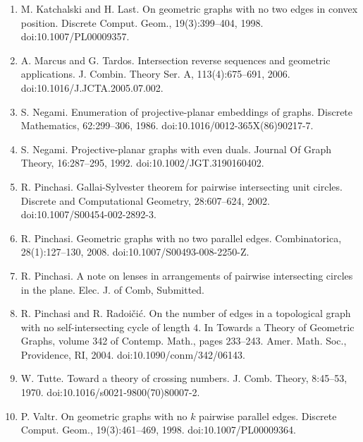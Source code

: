 \begin{enumerate}
\item[]  [12]  M. Katchalski and H. Last.  On geometric graphs with no two edges in convex position.  Discrete Comput. Geom., 19(3):399–404, 1998.  doi:10.1007/PL00009357.  
\item[]  [13]  A. Marcus and G. Tardos.  Intersection reverse sequences and geometric applications.  J. Combin. Theory Ser. A, 113(4):675–691, 2006.  doi:10.1016/J.JCTA.2005.07.002.  
\item[]  [14]  S. Negami.  Enumeration of projective-planar embeddings of graphs.  Discrete Mathematics, 62:299–306, 1986.  doi:10.1016/0012-365X(86)90217-7.  
\item[]  [15]  S. Negami.  Projective-planar graphs with even duals.  Journal Of Graph Theory, 16:287–295, 1992.  doi:10.1002/JGT.3190160402.  
\item[]  [16]  R. Pinchasi.  Gallai-Sylvester theorem for pairwise intersecting unit circles.  Discrete and Computational Geometry, 28:607–624, 2002.  doi:10.1007/S00454-002-2892-3.  
\item[]  [17]  R. Pinchasi.  Geometric graphs with no two parallel edges.  Combinatorica, 28(1):127–130, 2008.  doi:10.1007/S00493-008-2250-Z.  
\item[]  [18]  R. Pinchasi.  A note on lenses in arrangements of pairwise intersecting circles in the plane.  Elec. J. of Comb, Submitted.  
\item[]  [19]  R. Pinchasi and R. Radoičić.  On the number of edges in a topological graph with no self-intersecting cycle of length $4$.  In Towards a Theory of Geometric Graphs, volume 342 of Contemp. Math., pages 233–243. Amer. Math. Soc., Providence, RI, 2004.  doi:10.1090/conm/342/06143.  
\item[]  [20]  W. Tutte.  Toward a theory of crossing numbers.  J. Comb. Theory, 8:45–53, 1970.  doi:10.1016/s0021-9800(70)80007-2.  
\item[]  [21]  P. Valtr.  On geometric graphs with no $k$ pairwise parallel edges.  Discrete Comput. Geom., 19(3):461–469, 1998.  doi:10.1007/PL00009364.  
\end{enumerate}
\par
